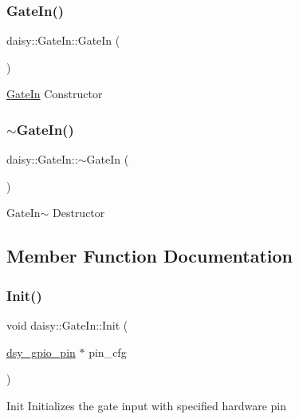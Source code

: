 \subsubsection{\texorpdfstring{Gate\+In()}{GateIn()}}
{\footnotesize\ttfamily daisy\+::\+Gate\+In\+::\+Gate\+In (\begin{DoxyParamCaption}{ }\end{DoxyParamCaption})\hspace{0.3cm}{\ttfamily [inline]}}

\hyperlink{classdaisy_1_1_gate_in}{Gate\+In} Constructor \mbox{\label{classdaisy_1_1_gate_in_af38fd662789d9d746f184703a2998f80}} 
\subsubsection{\texorpdfstring{$\sim$\+Gate\+In()}{~GateIn()}}
{\footnotesize\ttfamily daisy\+::\+Gate\+In\+::$\sim$\+Gate\+In (\begin{DoxyParamCaption}{ }\end{DoxyParamCaption})\hspace{0.3cm}{\ttfamily [inline]}}

Gate\+In$\sim$ Destructor 

\subsection{Member Function Documentation}
\mbox{\label{classdaisy_1_1_gate_in_ab8f9cff6bcb78ec631cfa0d026c7f3b7}} 
\subsubsection{\texorpdfstring{Init()}{Init()}}
{\footnotesize\ttfamily void daisy\+::\+Gate\+In\+::\+Init (\begin{DoxyParamCaption}\item[{\hyperlink{structdsy__gpio__pin}{dsy\+\_\+gpio\+\_\+pin} $\ast$}]{pin\+\_\+cfg }\end{DoxyParamCaption})}

Init Initializes the gate input with specified hardware pin \mbox{\label{classdaisy_1_1_gate_in_a6a9bac9fe44985baa7097bd47a90a40f}} 
